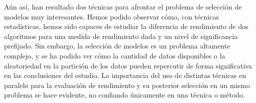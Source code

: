 \documentclass[a4paper,12pt]{article}
\begin{document}
Aún así, han resultado dos técnicas para afrontar el problema de selección de modelos muy interesantes. Hemos podido observar cómo, con técnicas estadísticas, hemos sido capaces de estudiar la diferencia de rendimiento de dos algoritmos para una medida de rendimiento dada y un nivel de significancia prefijado. Sin embargo, la selección de modelos es un problema altamente complejo, y se ha podido ver cómo la cantidad de datos disponibles o la aleatoriedad en la partición de los datos pueden repercutir de forma significativa en las conclusiones del estudio. La importancia del uso de distintas técnicas en paralelo para la evaluación de rendimiento y su posterior selección en un mismo problema se hace evidente, no confiando únicamente en una técnica o método.

\newpage


\end{document}
